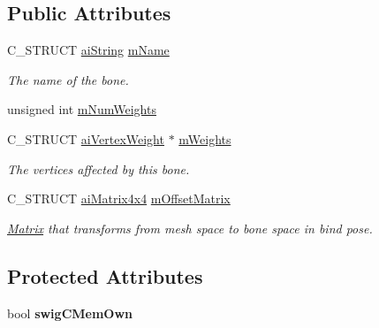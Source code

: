 \subsection*{Public Attributes}
\begin{DoxyCompactItemize}
\item 
\hypertarget{structai_bone_acfb9bfd2a2c6302181d7c3cc1bb8bbf0}{C\+\_\+\+S\+T\+R\+U\+C\+T \hyperlink{structai_string}{ai\+String} \hyperlink{structai_bone_acfb9bfd2a2c6302181d7c3cc1bb8bbf0}{m\+Name}}\label{structai_bone_acfb9bfd2a2c6302181d7c3cc1bb8bbf0}

\begin{DoxyCompactList}\small\item\em The name of the bone. \end{DoxyCompactList}\item 
unsigned int \hyperlink{structai_bone_a87a79d42a0132753aac66397ad6f9b71}{m\+Num\+Weights}
\item 
\hypertarget{structai_bone_ade36319714b58c03ad46aae30a2724a4}{C\+\_\+\+S\+T\+R\+U\+C\+T \hyperlink{structai_vertex_weight}{ai\+Vertex\+Weight} $\ast$ \hyperlink{structai_bone_ade36319714b58c03ad46aae30a2724a4}{m\+Weights}}\label{structai_bone_ade36319714b58c03ad46aae30a2724a4}

\begin{DoxyCompactList}\small\item\em The vertices affected by this bone. \end{DoxyCompactList}\item 
\hypertarget{structai_bone_a1dd6c4f24a1384c05da281692be3e78d}{C\+\_\+\+S\+T\+R\+U\+C\+T \hyperlink{structai_matrix4x4}{ai\+Matrix4x4} \hyperlink{structai_bone_a1dd6c4f24a1384c05da281692be3e78d}{m\+Offset\+Matrix}}\label{structai_bone_a1dd6c4f24a1384c05da281692be3e78d}

\begin{DoxyCompactList}\small\item\em \hyperlink{class_matrix}{Matrix} that transforms from mesh space to bone space in bind pose. \end{DoxyCompactList}\end{DoxyCompactItemize}
\subsection*{Protected Attributes}
\begin{DoxyCompactItemize}
\item 
\hypertarget{structai_bone_a7b4848df684b10e366d1d5f193844cdd}{bool {\bfseries swig\+C\+Mem\+Own}}\label{structai_bone_a7b4848df684b10e366d1d5f193844cdd}

\end{DoxyCompactItemize}
